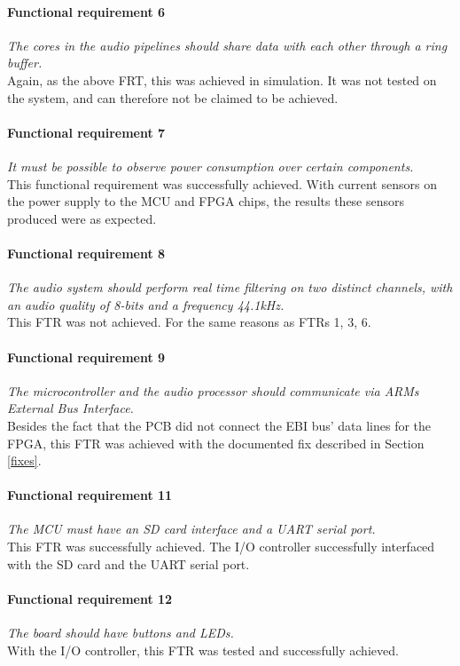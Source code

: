 \paragraph{Functional requirement 6}
\textit{The cores in the audio pipelines should share data with each other through a ring buffer.}\\
Again, as the above FRT, this was achieved in simulation. It was not tested on the system, and can therefore not be claimed to be achieved.

\paragraph{Functional requirement 7}
\textit{It must be possible to observe power consumption over certain components.}\\
This functional requirement was successfully achieved. With current sensors on the power supply to the MCU and FPGA chips, the results these sensors produced were as expected.

\paragraph{Functional requirement 8}
\textit{The audio system should perform real time filtering on two distinct
channels, with an audio quality of 8-bits and a frequency 44.1kHz.}\\
This FTR was not achieved. For the same reasons as FTRs 1, 3, 6.

\paragraph{Functional requirement 9}
\textit{The microcontroller and the audio processor should communicate via ARMs
External Bus Interface.}\\
Besides the fact that the PCB did not connect the EBI bus' data lines for the FPGA, this FTR was achieved with the documented fix described in Section \ref{fixes}.

\paragraph{Functional requirement 11}
\textit{The MCU must have an SD card interface and a UART serial port.}\\
This FTR was successfully achieved. The I/O controller successfully interfaced with the SD card and the UART serial port.

\paragraph{Functional requirement 12}
\textit{The board should have buttons and LEDs.}\\
With the I/O controller, this FTR was tested and successfully achieved.

